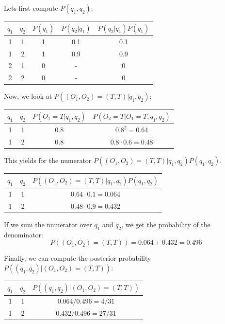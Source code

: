 Lets first compute $P(q_1, q_2)$:

\begin{center}
\begin{tabular}{c | c | c | c | c}
    $q_1$ & $q_2$ & $P(q_1)$ &  $P(q_2|q_1)$ & $P(q_2| q_1) P(q_1) $\\ \hline
    1       & 1   &   1      &    0.1        &   0.1 \\
    1       & 2   &   1      &    0.9        &   0.9 \\
    2       & 1   &   0      &    -        &   0 \\
    2       & 2   &   0      &    -        &   0 \\
\end{tabular}
\end{center}

Now, we look at $ P((O_1, O_2) = (T, T) | q_1, q_2)$:

\begin{center}
\begin{tabular}{c | c | c | c }
    $q_1$ & $q_2$ & $P(O_1 = T | q_1, q_2)$ & $P(O_2 = T | O_1 = T , q_1, q_2)$ \\ \hline
    1       & 1   & 0.8 & $0.8^2 = 0.64 $\\
    1       & 2   & 0.8 & $0.8 \cdot 0.6 = 0.48$  \\
\end{tabular}
\end{center}

This yields for the numerator $P((O_1, O_2) = (T, T) | q_1, q_2) P(q_1, q_2)$.

\begin{center}
\begin{tabular}{c | c | c }
    $q_1$ & $q_2$ & $P((O_1, O_2) = (T, T) | q_1, q_2) P(q_1, q_2) $ \\ \hline
    1       & 1   & $0.64 \cdot 0.1 = 0.064 $\\
    1       & 2   & $0.48 \cdot 0.9 = 0.432 $  \\
\end{tabular}
\end{center}

If we sum the numerator over $q_1$ and $q_2$, we get the probability of the denominator:
\begin{equation}
    P((O_1, O_2) = (T, T)) = 0.064 + 0.432 = 0.496
\end{equation}

Finally, we can compute the posterior probability $P((q_1, q_2 )| (O_1, O_2) = (T, T))$:
\begin{center}
\begin{tabular}{c | c | c }
    $q_1$ & $q_2$ & $P((q_1, q_2 )| (O_1, O_2) = (T, T))$ \\ \hline
    1       & 1   & $ 0.064 / 0.496 = 4 / 31 $\\
    1       & 2   & $ 0.432 / 0.496 = 27 / 31$ \\
\end{tabular}
\end{center}

